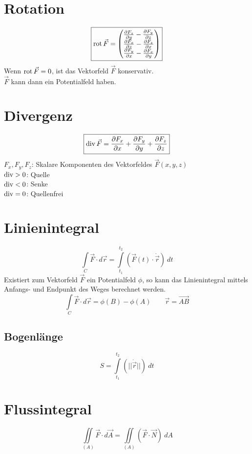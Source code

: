 \section{Rotation}
\[ \boxed{\rot \vec{F} = \left( \begin{array}{@{}l@{}} 
\frac{\partial F_z}{\partial y} - \frac{\partial F_y}{\partial z} \\
\frac{\partial F_x}{\partial z} - \frac{\partial F_z}{\partial x} \\
\frac{\partial F_y}{\partial x} - \frac{\partial F_x}{\partial y} \\
\end{array}\right)} \]
Wenn $\operatorname{rot}\vec{F}=0$, ist das Vektorfeld $\vec{F}$ konservativ. \\
$\vec{F}$ kann dann ein Potentialfeld haben.

\section{Divergenz}
\[ \boxed{\operatorname{div} \vec{F} = \frac{\partial F_x}{\partial x} 
+ \frac{\partial F_y}{\partial y} + \frac{\partial F_z}{\partial z}} \]
$F_x, F_y, F_z$: Skalare Komponenten des Vektorfeldes $\vec{F}(x,y,z)$\\
$\operatorname{div} > 0$: Quelle \\
$\operatorname{div} < 0$: Senke \\
$\operatorname{div} = 0$: Quellenfrei

\section{Linienintegral}
\[ \boxed{\int\limits_{C} \vec{F} \cdot d\vec{r} 
= \int\limits_{t_1}^{t_2} \left(\vec{F}(t) \cdot \dot{\vec{r}}\right) ~ dt} \]
Existiert zum Vektorfeld $\vec{F}$ ein Potentialfeld $\phi$, so kann das 
Linienintegral mittels Anfangs- und Endpunkt des Weges berechnet werden. 
\[ \boxed{\int\limits_{C} \vec{F} \cdot d \vec{r} = \phi(B) - \phi(A)} 
\qquad \vec{r} = \overrightarrow{AB} \]

\subsection{Bogenlänge}
\[ \boxed{S = \int\limits_{t_1}^{t_2} \left(|| \dot{\vec{r}} ||\right) ~dt} \]

\section{Flussintegral}
\[ \boxed{\iint\limits_{(A)} \vec{F} \cdot d\vec{A} 
= \iint\limits_{(A)} (\vec{F} \cdot \vec{N}) ~ dA} \]

